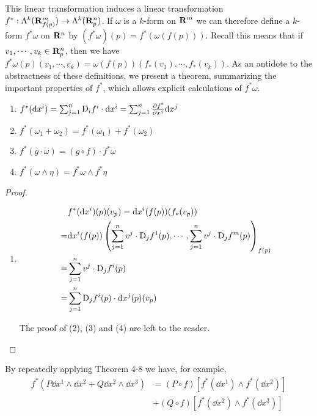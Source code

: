 This linear transformation induces a linear transformation $f^*:\Lambda^k(\mathbf{R}^m_{f(p)})\to \Lambda^k(\mathbf{R}^n_p)$.
If $\omega$ is a $k$-form on $\mathbf{R}^m$ we can therefore define a $k$-form $f^*\omega$ on $\mathbf{R}^n$ by
$(f^*\omega)(p) = f^*(\omega(f(p)))$. Recall this means that if $v_1,\cdots,v_k\in\mathbf{R}^n_p$, then we have 
$f^*\omega(p)(v_1,\cdots,v_k) = \omega(f(p))(f_*(v_1), \cdots, f_*(v_k))$. As an antidote to the abstractness
of these definitions, we present a theorem, summarizing the important properties of $f^*$, which allows explicit 
calculations of $f^*\omega$.

\begin{theorem}
    \begin{enumerate}[label=\upshape{(\arabic*)}]
        \item $f^*(\mathrm{d} x^i) = \sum_{j=1}^{n}{\mathrm{D}_if^i\cdot \mathrm{d} x^i} = \sum_{j=1}^{n}{\frac{\partial f^i}{\partial x^j}\mathrm{d} x^j}$
        \item $f^*(\omega_1+\omega_2) = f^*(\omega_1) + f^*(\omega_2)$
        \item $f^*(g\cdot \omega) = (g\circ f)\cdot f^*\omega$
        \item $f^*(\omega\wedge\eta) = f^*\omega\wedge f^*\eta$
    \end{enumerate}
\end{theorem}

\begin{proof}
    \begin{enumerate}[label=\upshape{(\arabic*)}]
        \item \;\vspace*{-2em}
            \begin{align*}
                & f^*(\mathrm{d} x^i)(p)(v_p)
                    = \mathrm{d} x^i(f(p))(f_*(v_p)) \\
                = & \mathrm{d} x^i(f(p))\left(\sum_{j=1}^{n}{v^j\cdot \mathrm{D}_jf^1(p)}, \cdots, \sum_{j=1}^{n}{v^j\cdot \mathrm{D}_jf^m(p)}\right)_{f(p)} \\
                = & \sum_{j=1}^{n}{v^j\cdot \mathrm{D}_jf^i(p)}\\
                = & \sum_{j=1}^{n}{\mathrm{D}_jf^i(p)\cdot \mathrm{d} x^j(p)(v_p)}
            \end{align*}

            The proof of (2), (3) and (4) are left to the reader.
    \end{enumerate}
\end{proof}

By repeatedly applying Theorem 4-8 we have, for example,
\begin{align*}
    f^*(P\dd x^1 \wedge \dd x^2 + Q\dd x^2 \wedge \dd x^3)
    & = (P\circ f)\left[f^*(\dd x^1)\wedge f^*(\dd x^2)\right]\\
    & + (Q\circ f)\left[f^*(\dd x^2)\wedge f^*(\dd x^3)\right]
\end{align*}

